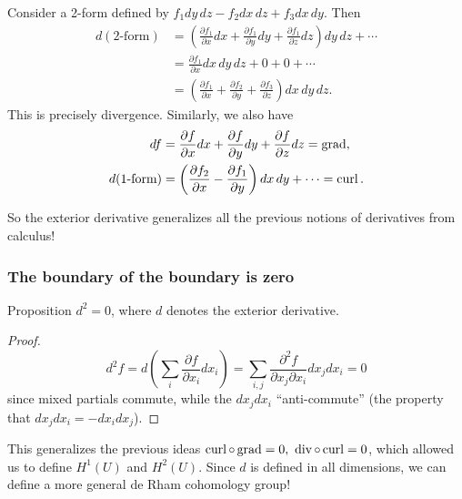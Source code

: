 \documentclass[xcolor=dvipsnames]{beamer}
\begin{document}
    \begingroup
    \small
    \begin{frame}
       \begin{example}
        Consider a 2-form defined by $f_1dy\,dz-f_2dx\,dz+f_3dx\,dy$. Then 
\begin{align*}
              d(2\text{-form})&=\left( \frac{\partial f_1}{\partial x}dx+\frac{\partial f_1}{\partial y}dy+\frac{\partial f_1}{\partial z}dz \right) dy\,dz+\cdots \\
                              &=\frac{\partial f_1}{\partial x}dx\,dy\,dz+0+0+\cdots \\
                              &=\left( \frac{\partial f_1}{\partial x}+\frac{\partial f_2}{\partial y}+\frac{\partial f_3}{\partial z}  \right) dx\,dy\,dz.
\end{align*}
          This is precisely divergence. Similarly, we also have 
          \begin{align*}
              df&=\frac{\partial f}{\partial x}dx+\frac{\partial f}{\partial y}dy+\frac{\partial f}{\partial z}dz=\operatorname{grad} ,\\
              d(1\text{-form} )&=\left( \frac{\partial f_2}{\partial x}-\frac{\partial f_1}{\partial y} \right) dx\,dy+\cdots =\operatorname{curl}.
          \end{align*}
       \end{example} %
So the exterior derivative generalizes all the previous notions of derivatives from calculus!
    \end{frame}
\endgroup

\begin{frame}
    \frametitle{The boundary of the boundary is zero} 
    \begin{block}{Proposition} 
       $d^2=0$, where $d$ denotes the exterior derivative. 
    \end{block}\pause
    \begin{proof}
        \[
            d^2 f= d\left( \sum _i \frac{\partial f}{\partial x_i }dx_i  \right) =\sum _{i,j}\frac{\partial ^2 f}{\partial x_j \partial x_i }dx_j dx_i =0
        \] since mixed partials commute, while the $dx_j dx_i $ ``anti-commute'' (the property that $dx_j dx_i =-dx_i dx_j $).
    \end{proof}%
    This generalizes the previous ideas $\operatorname{curl} \circ \operatorname{grad}=0,\ \operatorname{div} \circ \operatorname{curl}=0$, which allowed us to define $H^1(U)$ and $H^2(U)$. Since $d$ is defined in all dimensions, we can define a more general de Rham cohomology group!
\end{frame}
\end{document}
